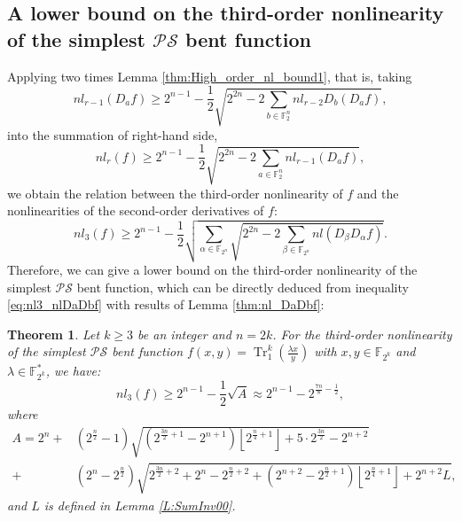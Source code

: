 \documentclass{article}
\newcommand{\F}{\mathbb{F}}
\newcommand{\0}{\textbf{0}}
\newcommand{\1}{\textbf{1}}
\newcommand{\nl}{\mathrm{nl}}
\newcommand{\TRACE}{\operatorname{Tr}_1^k}
\theoremstyle{plain}
\newtheorem{theorem}{Theorem}
\begin{document}
    \subsection{A lower bound on the third-order nonlinearity of the simplest $ \mathcal{PS} $ bent function}
    Applying two times Lemma \ref{thm:High_order_nl_bound1}, that is, taking  
    \[nl_{r-1}(D_af) \ge 2^{n-1}-\frac{1}{2}\sqrt{2^{2n}-2\sum_{b\in\F_2^n}nl_{r-2}D_b(D_af)},\]
    into the summation of right-hand side, 
    \[nl_r(f) \ge 2^{n-1}-\frac{1}{2}\sqrt{2^{2n}-2\sum_{a\in\F_2^n}nl_{r-1}(D_af)},\]
    we obtain the relation between the third-order nonlinearity of $ f $ and the nonlinearities of the second-order derivatives of $ f $:
    \begin{equation}\label{eq:nl3_nlDaDbf}
        nl_3(f)\ge 2^{n-1}-\frac{1}{2}\sqrt{\sum_{\alpha\in\F_{2^n}}\sqrt{2^{2n}-2\sum_{\beta\in\F_{2^n}} nl(D_{\beta}D_{\alpha}f)}}. 
    \end{equation}
    Therefore, we can give a lower bound on the third-order nonlinearity of the simplest $ \mathcal{PS} $ bent function, which can be 
    directly deduced from inequality \eqref{eq:nl3_nlDaDbf} with results of Lemma \ref{thm:nl_DaDbf}:   
    \begin{theorem}\label{th:our_lower_bound}
        Let $ k\ge 3 $ be an integer and $ n=2k $. For the third-order nonlinearity of 
        the simplest $ \mathcal{PS} $ bent function 
        $ f(x,y)=\TRACE(\frac{\lambda x}{y}) $ with $ x,y\in\F_{2^k} $ and $ \lambda\in\F_{2^k}^* $, we have:
        \[nl_3(f)\ge 2^{n-1}-\frac{1}{2}\sqrt{A}\approx 2^{n-1}-2^{\frac{7n}{8}-\frac{1}{2}},\]
        where
        \begin{align*}
            A=2^n+&(2^{\frac{n}{2}}-1)\sqrt{(2^{\frac{3n}{2}+1}-2^{n+1})\left\lfloor 2^{\frac{n}{4}+1}\right\rfloor+5\cdot 2^{\frac{3n}{2}}-2^{n+2}}\\
            +&(2^n-2^{\frac{n}{2}})\sqrt{2^{\frac{3n}{2}+2}+2^n-2^{\frac{n}{2}+2}+(2^{n+2}-2^{\frac{n}{2}+1})\left\lfloor 2^{\frac{n}{4}+1}\right\rfloor+2^{n+2}L},
        \end{align*}
        and $ L $ is defined in Lemma \ref{L:SumInv00}. 
    \end{theorem}
\end{document}
